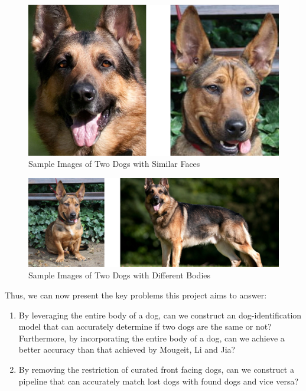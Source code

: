 \documentclass{article}
\begin{document}
\begin{figure}[h]
\centering
	\includegraphics{final-report-images/similar_faces.png}
\caption{Sample Images of Two Dogs with Similar Faces}
\label{fig:x similar faces}
\end{figure}

\newpage

\begin{figure}[h]
\centering
	\includegraphics{final-report-images/different_bodies.png}
\caption{Sample Images of Two Dogs with Different Bodies}
\label{fig:x different bodies}
\end{figure}

Thus, we can now present the key problems this project aims to answer:

\begin{enumerate}
  \item By leveraging the entire body of a dog, can we construct an dog-identification model that can accurately determine if two dogs are the same or not?  Furthermore, by incorporating the entire body of a dog, can we achieve a better accuracy than that achieved by Mougeit, Li and Jia?
  \item By removing the restriction of curated front facing dogs, can we construct a pipeline that can accurately match lost dogs with found dogs and vice versa? 
\end{enumerate}
\end{document}
